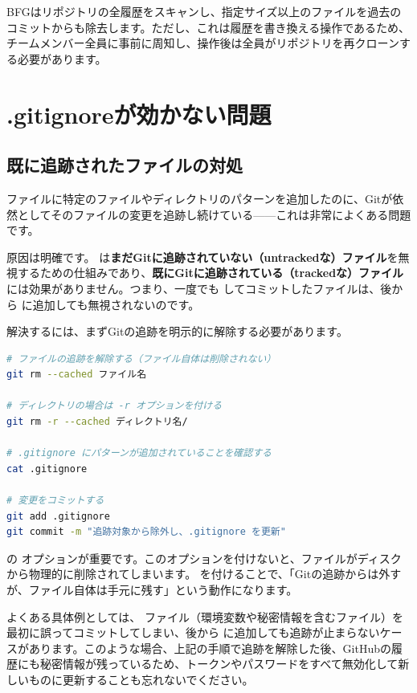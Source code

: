 BFGはリポジトリの全履歴をスキャンし、指定サイズ以上のファイルを過去のコミットからも除去します。ただし、これは履歴を書き換える操作であるため、チームメンバー全員に事前に周知し、操作後は全員がリポジトリを再クローンする必要があります。

\section{.gitignoreが効かない問題}

\subsection{既に追跡されたファイルの対処}

 ファイルに特定のファイルやディレクトリのパターンを追加したのに、Gitが依然としてそのファイルの変更を追跡し続けている------これは非常によくある問題です。

原因は明確です。 は\textbf{まだGitに追跡されていない（untrackedな）ファイル}を無視するための仕組みであり、\textbf{既にGitに追跡されている（trackedな）ファイル}には効果がありません。つまり、一度でも  してコミットしたファイルは、後から  に追加しても無視されないのです。

解決するには、まずGitの追跡を明示的に解除する必要があります。

\begin{lstlisting}[language=bash]
# ファイルの追跡を解除する（ファイル自体は削除されない）
git rm --cached ファイル名

# ディレクトリの場合は -r オプションを付ける
git rm -r --cached ディレクトリ名/

# .gitignore にパターンが追加されていることを確認する
cat .gitignore

# 変更をコミットする
git add .gitignore
git commit -m "追跡対象から除外し、.gitignore を更新"
\end{lstlisting}

 の  オプションが重要です。このオプションを付けないと、ファイルがディスクから物理的に削除されてしまいます。 を付けることで、「Gitの追跡からは外すが、ファイル自体は手元に残す」という動作になります。

よくある具体例としては、 ファイル（環境変数や秘密情報を含むファイル）を最初に誤ってコミットしてしまい、後から  に追加しても追跡が止まらないケースがあります。このような場合、上記の手順で追跡を解除した後、GitHubの履歴にも秘密情報が残っているため、トークンやパスワードをすべて無効化して新しいものに更新することも忘れないでください。

